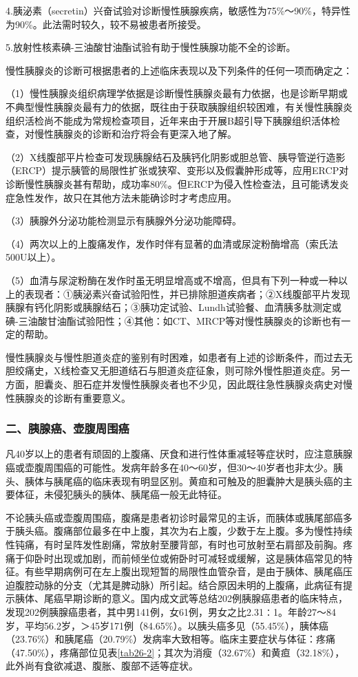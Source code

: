 4.胰泌素（secretin）兴奋试验对诊断慢性胰腺疾病，敏感性为75\%～90\%，特异性为90\%。此法需时较久，较不易被患者所接受。

5.放射性核素碘-三油酸甘油酯试验有助于慢性胰腺功能不全的诊断。

慢性胰腺炎的诊断可根据患者的上述临床表现以及下列条件的任何一项而确定之：

（1）慢性胰腺炎组织病理学依据是诊断慢性胰腺炎最有力依据，也是诊断早期或不典型慢性胰腺炎最有力的依据，既往由于获取胰腺组织较困难，有关慢性胰腺炎组织活检尚不能成为常规检查项目，近年来由于开展B超引导下胰腺组织活体检查，对慢性胰腺炎的诊断和治疗将会有更深入地了解。

（2）X线腹部平片检查可发现胰腺结石及胰钙化阴影或胆总管、胰导管逆行造影（ERCP）提示胰管的局限性扩张或狭窄、变形以及假囊肿形成等，应用ERCP对诊断慢性胰腺炎甚有帮助，成功率80\%。但ERCP为侵入性检查法，且可能诱发炎症急性发作，故只在其他方法未能确诊时才考虑应用。

（3）胰腺外分泌功能检测显示有胰腺外分泌功能障碍。

（4）两次以上的上腹痛发作，发作时伴有显著的血清或尿淀粉酶增高（索氏法500U以上）。

（5）血清与尿淀粉酶在发作时虽无明显增高或不增高，但具有下列一种或一种以上的表现者：①胰泌素兴奋试验阳性，并已排除胆道疾病者；②X线腹部平片发现胰腺有钙化阴影或胰腺结石；③胰功定试验、Lundh试验餐、血清胰多肽测定或碘-三油酸甘油酯试验阳性；④其他：如CT、MRCP等对慢性胰腺炎的诊断也有一定的帮助。

慢性胰腺炎与慢性胆道炎症的鉴别有时困难，如患者有上述的诊断条件，而过去无胆绞痛史，X线检查又无胆道结石与胆道炎症征象，则可除外慢性胆道炎症。另一方面，胆囊炎、胆石症并发慢性胰腺炎者也不少见，因此既往急性胰腺炎病史对慢性胰腺炎的诊断有重要意义。

\subsubsection{二、胰腺癌、壶腹周围癌}

凡40岁以上的患者有顽固的上腹痛、厌食和进行性体重减轻等症状时，应注意胰腺癌或壶腹周围癌的可能性。发病年龄多在40～60岁，但30～40岁者也非太少。胰头、胰体与胰尾癌的临床表现有明显区别。黄疸和可触及的胆囊肿大是胰头癌的主要体征，未侵犯胰头的胰体、胰尾癌一般无此特征。

不论胰头癌或壶腹周围癌，腹痛是患者初诊时最常见的主诉，而胰体或胰尾部癌多于胰头癌。腹痛部位最多在中上腹，其次为右上腹，少数于左上腹。多为慢性持续性钝痛，有时呈阵发性剧痛，常放射至腰背部，有时也可放射至右肩部及前胸。疼痛于仰卧时出现或加剧，而前倾坐位或俯卧时可减轻或缓解，这是胰体癌常见的特征。有些早期病例可在左上腹出现短暂的局限性血管杂音，是由于胰体、胰尾癌压迫腹腔动脉的分支（尤其是脾动脉）所引起。结合原因未明的上腹痛，此病征有提示胰体、尾癌早期诊断的意义。国内成文武等总结202例胰腺癌患者的临床特点，发现202例胰腺癌患者，其中男141例，女61例，男女之比2.31∶1。年龄27～84岁，平均56.2岁，＞45岁171例（84.65\%）。以胰头癌多见（55.45\%），胰体癌（23.76\%）和胰尾癌（20.79\%）发病率大致相等。临床主要症状与体征：疼痛（47.50\%），疼痛部位见表\ref{tab26-2}；其次为消瘦（32.67\%）和黄疸（32.18\%），此外尚有食欲减退、腹胀、腹部不适等症状。

